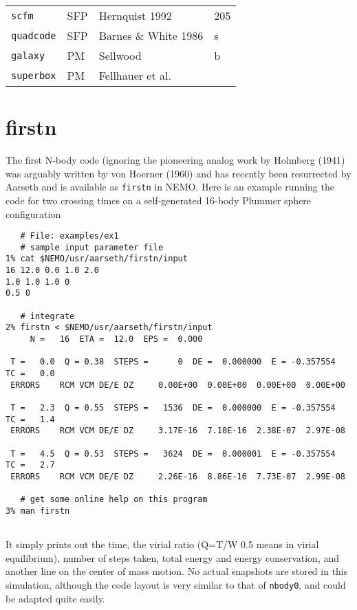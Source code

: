 \begin{center}
\begin{table}[h]
\begin{tabular}{||l|l|l|l||}
{\tt scfm} & SFP & Hernquist 1992 & 205 \\

{\tt quadcode} & SFP & Barnes \& White 1986 & s \\

{\tt galaxy} & PM & Sellwood  & b \\

{\tt superbox} & PM &  Fellhauer et al. & \\

\hline 

\end{tabular}
\label{t:codes}
\end{table}
\end{center}

\section{firstn}

The first N-body code (ignoring the pioneering analog work by 
Holmberg (1941)
was arguably written by von Hoerner (1960)  %
and has recently
been resurrected by Aarseth and is available as {\tt firstn} in NEMO. Here is an
example running the code for two crossing times on a self-generated 16-body
Plummer sphere configuration

\footnotesize\begin{verbatim}
   # File: examples/ex1
   # sample input parameter file
1% cat $NEMO/usr/aarseth/firstn/input
16 12.0 0.0 1.0 2.0
1.0 1.0 1.0 0
0.5 0

   # integrate 
2% firstn < $NEMO/usr/aarseth/firstn/input
     N =   16  ETA =  12.0  EPS =  0.000
 
 T =   0.0  Q = 0.38  STEPS =      0  DE =  0.000000  E = -0.357554  TC =   0.0
 ERRORS    RCM VCM DE/E DZ     0.00E+00  0.00E+00  0.00E+00  0.00E+00
 
 T =   2.3  Q = 0.55  STEPS =   1536  DE =  0.000000  E = -0.357554  TC =   1.4
 ERRORS    RCM VCM DE/E DZ     3.17E-16  7.10E-16  2.38E-07  2.97E-08
 
 T =   4.5  Q = 0.53  STEPS =   3624  DE =  0.000001  E = -0.357554  TC =   2.7
 ERRORS    RCM VCM DE/E DZ     2.26E-16  8.86E-16  7.73E-07  2.99E-08

   # get some online help on this program
3% man firstn
 
\end{verbatim}\normalsize

It simply prints out the time, the virial ratio (Q=T/W 0.5 means in virial
equilibrium), number of steps taken, total energy and energy conservation, and another 
line on the center of mass motion. No actual snapshots are stored in this 
simulation, although the code layout is very similar to that of {\tt nbody0},
and could be adapted quite easily.

